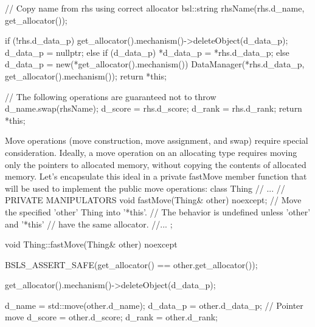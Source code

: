 {{{    // Copy name from rhs using correct allocator
    bsl::string rhsName(rhs.d_name, get_allocator());

    if (!rhs.d_data_p) {
        get_allocator().mechanism()->deleteObject(d_data_p);
        d_data_p = nullptr;
    }
    else if (d_data_p) {
        *d_data_p = *rhs.d_data_p;
    }
    else {
        d_data_p = new(*get_allocator().mechanism())
                  DataManager(*rhs.d_data_p, get_allocator().mechanism());
        return *this;
    }
    
    // The following operations are guaranteed not to throw
    d_name.swap(rhsName);
    d_score = rhs.d_score;
    d_rank  = rhs.d_rank;
    return *this;
}
Move operations (move construction, move assignment, and swap) require special consideration. Ideally, a move operation on an allocating type requires moving only the pointers to allocated memory, without copying the contents of allocated memory. Let’s encapsulate this ideal in a private fastMove member function that will be used to implement the public move operations:
class Thing {
    // ...
    // PRIVATE MANIPULATORS
    void fastMove(Thing& other) noexcept;
        // Move the specified 'other' Thing into '*this'.
        // The behavior is undefined unless 'other' and '*this'
        // have the same allocator.
    //...
};

void
Thing::fastMove(Thing& other) noexcept
{
    BSLS_ASSERT_SAFE(get_allocator() == other.get_allocator());

    get_allocator().mechanism()->deleteObject(d_data_p);

    d_name   = std::move(other.d_name);
    d_data_p = other.d_data_p;  // Pointer move
    d_score  = other.d_score;
    d_rank   = other.d_rank;

}}}
